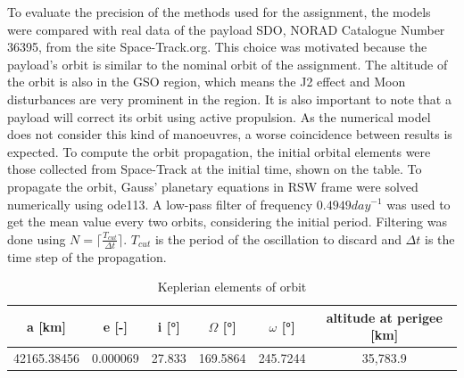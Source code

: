 \documentclass{article}
\begin{document}
To evaluate the precision of the methods used for the assignment, the models were compared with real data of the payload SDO, NORAD Catalogue Number 36395, from the site Space-Track.org. This choice was motivated because the payload’s orbit is similar to the nominal orbit of the assignment. The altitude of the orbit is also in the GSO region, which means the J2 effect and Moon disturbances are very prominent in the region. It is also important to note that a payload will correct its orbit using active propulsion. As the numerical model does not consider this kind of manoeuvres, a worse coincidence between results is expected. To compute the orbit propagation, the initial orbital elements were those collected from Space-Track at the initial time, shown on the table. To propagate the orbit, Gauss’ planetary equations in RSW frame were solved numerically using ode113. A low-pass filter of frequency $0.4949  day^{-1}$ was used to get the mean value every two orbits, considering the initial period. Filtering was done using \( N = \lceil \frac{T_{cut}}{\Delta t} \rceil \). \( T_{cut} \) is the period of the oscillation to discard and \( \Delta t \) is the time step of the propagation. 


\begin{table}[ht]
	\centering
	\caption{Keplerian elements of orbit}
	\label{tab:keplerian_elements}
	\begin{tabular}{|c|c|c|c|c|c|}
		\hline
		a [km] & e [-] & i [°] & $\Omega$ [°] & $\omega$ [°] & altitude at perigee [km] \\
		\hline
		42165.38456 & 0.000069 & 27.833 & 169.5864 & 245.7244 & 35,783.9 \\
		\hline
	\end{tabular}
\end{table}
\end{document}
